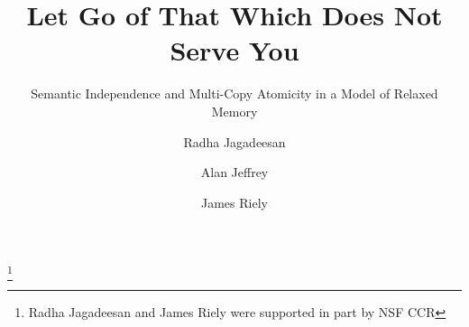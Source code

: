 \documentclass[acmsmall]{acmart}\settopmatter{printfolios=true}
\theoremstyle{acmdefinition}
\begin{document}
\title{Let Go of That Which Does Not Serve You}
\subtitle{Semantic Independence and Multi-Copy Atomicity in a Model of Relaxed Memory}





\author{Radha Jagadeesan}

\author{Alan Jeffrey}

\author{James Riely}


\thanks{Radha Jagadeesan and James Riely were supported in part by NSF CCR}
\end{document}
